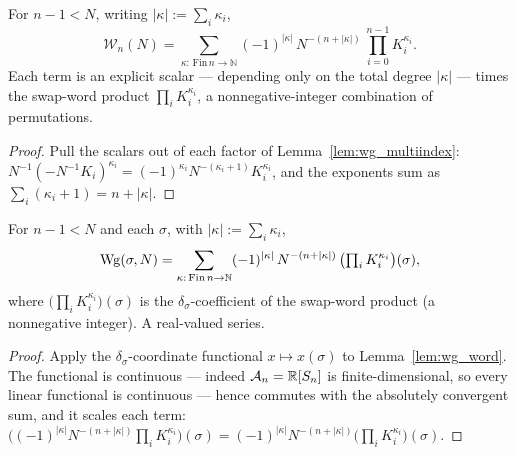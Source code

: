 \begin{lemma}\label{lem:wg_word}
\leanok
{}
For $n-1<N$, writing $|\kappa|:=\sum_i\kappa_i$,
\[
\mathcal W_n(N)
=\sum_{\kappa:\,\mathrm{Fin}\,n\to\mathbb N}
(-1)^{|\kappa|}\,N^{-(n+|\kappa|)}\,\prod_{i=0}^{n-1}K_i^{\kappa_i}.
\]
Each term is an explicit scalar --- depending only on the total degree
$|\kappa|$ --- times the swap-word product $\prod_i K_i^{\kappa_i}$, a
nonnegative-integer combination of permutations.
\end{lemma}
\begin{proof}\leanok{}
Pull the scalars out of each factor of Lemma~\ref{lem:wg_multiindex}:
$N^{-1}(-N^{-1}K_i)^{\kappa_i}=(-1)^{\kappa_i}N^{-(\kappa_i+1)}K_i^{\kappa_i}$,
and the exponents sum as $\sum_i(\kappa_i+1)=n+|\kappa|$.
\end{proof}

\begin{lemma}\label{lem:wg_coeff}
\leanok
{}
For $n-1<N$ and each $\sigma$, with $|\kappa|:=\sum_i\kappa_i$,
\[
\operatorname{Wg}(\sigma,N)
=\sum_{\kappa:\,\mathrm{Fin}\,n\to\mathbb N}
(-1)^{|\kappa|}\,N^{-(n+|\kappa|)}\,
\bigl(\textstyle\prod_{i}K_i^{\kappa_i}\bigr)(\sigma),
\]
where $\bigl(\prod_i K_i^{\kappa_i}\bigr)(\sigma)$ is the $\delta_\sigma$-coefficient
of the swap-word product (a nonnegative integer). A real-valued series.
\end{lemma}
\begin{proof}\leanok{}
Apply the $\delta_\sigma$-coordinate functional $x\mapsto x(\sigma)$ to
Lemma~\ref{lem:wg_word}. The functional is continuous --- indeed
$\mathcal{A}_{n}=\mathbb R[S_n]$ is finite-dimensional, so every linear functional is
continuous --- hence commutes with the absolutely convergent sum, and it scales
each term: $\bigl((-1)^{|\kappa|}N^{-(n+|\kappa|)}\prod_iK_i^{\kappa_i}\bigr)(\sigma)
=(-1)^{|\kappa|}N^{-(n+|\kappa|)}\bigl(\prod_iK_i^{\kappa_i}\bigr)(\sigma)$.
\end{proof}

